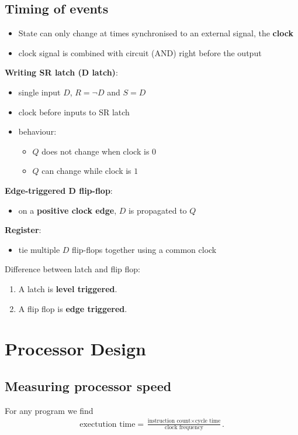 \documentclass{article}
\begin{document}
\subsection{Timing of events}
\begin{itemize}
	\item State can only change at times synchronised to an external signal, the \textbf{clock}
	\item clock signal is combined with circuit (AND) right before the output
\end{itemize}
\textbf{Writing SR latch (D latch)}:
\begin{itemize}
	\item single input $D$, $R=\neg D$ and $S=D$
	\item clock before inputs to SR latch
	\item behaviour: \begin{itemize}
		\item $Q$ does not change when clock is $0$
		\item $Q$ can change while clock is $1$
	\end{itemize}
\end{itemize}
\textbf{Edge-triggered D flip-flop}:
\begin{itemize}
	\item on a \textbf{positive clock edge}, $D$ is propagated to $Q$
\end{itemize}
\textbf{Register}:
\begin{itemize}
	\item tie multiple $D$ flip-flops together using a common clock
\end{itemize}
\begin{definition}
Difference between latch and flip flop:
\begin{enumerate}
	\item A latch is \textbf{level triggered}.
	\item A flip flop is \textbf{edge triggered}.
\end{enumerate}
\end{definition}
\section{Processor Design}
\subsection{Measuring processor speed}
\begin{theorem}
	\label{exectime}
	For any program we find 
	\begin{align*}
		\text{exectution time} 
		= \frac{\text{instruction count} \times \text{cycle time}}{\text{clock frequency}}.
	\end{align*}
\end{theorem}
\end{document}
